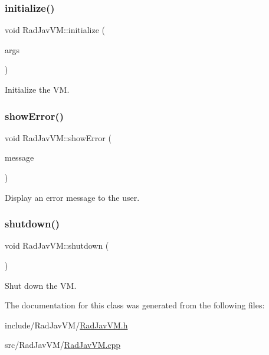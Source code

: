 \subsubsection{\texorpdfstring{initialize()}{initialize()}}
{\footnotesize\ttfamily void Rad\+Jav\+V\+M\+::initialize (\begin{DoxyParamCaption}\item[{Rad\+J\+A\+V\+::\+Array$<$ Rad\+J\+A\+V\+::\+String $>$}]{args }\end{DoxyParamCaption})\hspace{0.3cm}{\ttfamily [static]}}



Initialize the VM. 

\mbox{\label{class_rad_jav_v_m_aac738fd3fc4ad453782b31fab1f0600f}} 
\subsubsection{\texorpdfstring{show\+Error()}{showError()}}
{\footnotesize\ttfamily void Rad\+Jav\+V\+M\+::show\+Error (\begin{DoxyParamCaption}\item[{Rad\+J\+A\+V\+::\+String}]{message }\end{DoxyParamCaption})\hspace{0.3cm}{\ttfamily [static]}}



Display an error message to the user. 

\mbox{\label{class_rad_jav_v_m_afedb3afab462070c310a53503fa6632b}} 
\subsubsection{\texorpdfstring{shutdown()}{shutdown()}}
{\footnotesize\ttfamily void Rad\+Jav\+V\+M\+::shutdown (\begin{DoxyParamCaption}{ }\end{DoxyParamCaption})\hspace{0.3cm}{\ttfamily [static]}}



Shut down the VM. 



The documentation for this class was generated from the following files\+:\begin{DoxyCompactItemize}
\item 
include/\+Rad\+Jav\+V\+M/\mbox{\hyperlink{_rad_jav_v_m_8h}{Rad\+Jav\+V\+M.\+h}}\item 
src/\+Rad\+Jav\+V\+M/\mbox{\hyperlink{_rad_jav_v_m_8cpp}{Rad\+Jav\+V\+M.\+cpp}}\end{DoxyCompactItemize}
